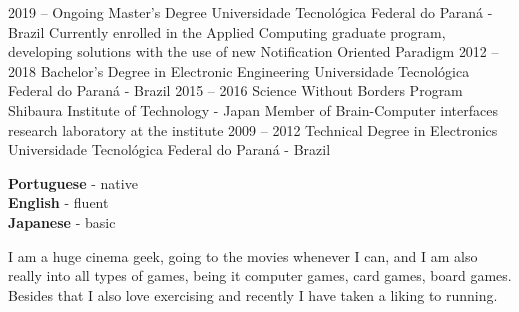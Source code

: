 \documentclass[9pt]{developercv} %
\begin{document}


\begin{entrylist}
	\entry
		{2019 -- Ongoing}
		{Master's Degree}
		{Universidade Tecnológica Federal do Paraná - Brazil}
		{Currently enrolled in the Applied Computing graduate program, developing solutions
		with the use of new Notification Oriented Paradigm}
	\entry
		{2012 -- 2018}
		{Bachelor's Degree in Electronic Engineering}
		{Universidade Tecnológica Federal do Paraná - Brazil}
		{}
	\entry
		{2015 -- 2016}
		{Science Without Borders Program}
		{Shibaura Institute of Technology - Japan}
		{Member of Brain-Computer interfaces research laboratory at the institute}
	\entry
		{2009 -- 2012}
		{Technical Degree in Electronics}
		{Universidade Tecnológica Federal do Paraná - Brazil}
		{}
\end{entrylist}


\begin{minipage}[t]{0.3\textwidth}
	\vspace{-\baselineskip} %

	
	\textbf{Portuguese} - native\\
	\textbf{English} - fluent\\
	\textbf{Japanese} - basic
\end{minipage}
\hfill
\begin{minipage}[t]{0.7\textwidth}
	\vspace{-\baselineskip} %
	

	I am a huge cinema geek, going to the movies whenever I can, and I am also really into all
	types of games, being it computer games, card games, board games. Besides that I also love 
	exercising and recently I have taken a liking to running.
\end{minipage}


\end{document}
